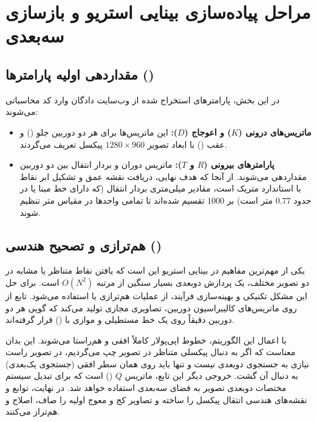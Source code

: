\documentclass[12pt,a4paper]{article}
\begin{document}
\section{ مراحل پیاده‌سازی بینایی استریو و بازسازی سه‌بعدی}

\subsection{مقداردهی اولیه پارامترها ()}	در این بخش، پارامترهای استخراج شده از وب‌سایت دادگان  وارد کد محاسباتی می‌شوند:
	\begin{itemize}
	\item \textbf{ماتریس‌های درونی ($K$) و اعوجاج ($D$):} این ماتریس‌ها برای هر دو دوربین جلو () و عقب () با ابعاد تصویر $1280\times960$ پیکسل تعریف می‌گردند.
	\item \textbf{پارامترهای بیرونی ($R$ و $T$):} ماتریس دوران و بردار انتقال بین دو دوربین مقداردهی می‌شوند. از آنجا که هدف نهایی، دریافت نقشه عمق و تشکیل ابر نقاط با استاندارد متریک است، مقادیر میلی‌متری بردار انتقال (که دارای خط مبنا یا  در حدود $0.77$ متر است) بر $1000$ تقسیم شده‌اند تا تمامی واحدها در مقیاس متر تنظیم شوند.
\end{itemize}

\subsection{هم‌ترازی و تصحیح هندسی ()}	یکی از مهم‌ترین مفاهیم در بینایی استریو این است که یافتن نقاط متناظر یا مشابه در دو تصویر مختلف، یک پردازش دو‌بعدی بسیار سنگین از مرتبه $O(N^2)$ است. برای حل این مشکل تکنیکی و بهینه‌سازی فرآیند، از عملیات هم‌ترازی یا  استفاده می‌شود.
		تابع  از روی ماتریس‌های کالیبراسیون دوربین، تصاویری مجازی تولید می‌کند که گویی هر دو دوربین دقیقاً روی یک خط مستطیلی و موازی با () قرار گرفته‌اند.
	
 با اعمال این الگوریتم، خطوط اپی‌پولار کاملاً افقی و هم‌راستا می‌شوند. این بدان معناست که اگر به دنبال پیکسلی متناظر در تصویر چپ می‌گردیم، در تصویر راست نیازی به جستجوی دوبعدی نیست و تنها باید روی همان سطر افقی (جستجوی یک‌بعدی) به دنبال آن گشت.
	خروجی دیگر این تابع، ماتریس $Q$ () است که برای تبدیل سیستم مختصات دوبعدی تصویر به فضای سه‌بعدی استفاده خواهد شد. در نهایت، توابع  و  نقشه‌های هندسی انتقال پیکسل را ساخته و تصاویر کج و معوج اولیه را صاف، اصلاح و هم‌تراز می‌کنند.
	
\end{document}
